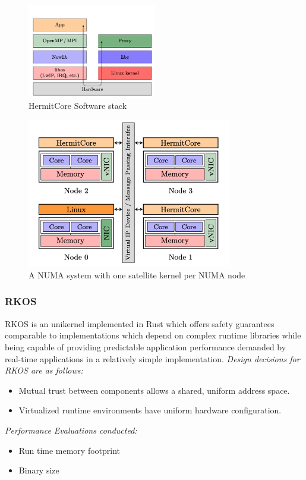 \begin{figure}[htbp!] 
  \centering    
  \includegraphics[width=0.5\textwidth]{HermitCoreStack}
  \caption[HermitCore]{HermitCore Software stack \cite{HermitCore}}
  \label{fig:HermitCoreStack}
  \end{figure}

  \begin{figure}[htbp!] 
    \centering    
    \includegraphics[width=0.8\textwidth]{NumaHermitCore}
    \caption[HermitCore]{A NUMA system with one satellite kernel per NUMA node \cite{HermitCore}}
    \label{fig:HermitCoreStack}
    \end{figure}



\subsubsection{RKOS}
RKOS\cite{RKOS} is an unikernel implemented in Rust which
offers safety guarantees comparable to implementations which depend on complex runtime
libraries while being capable of providing predictable application performance demanded
by real-time applications in a relatively simple implementation. 
\emph{Design decisions for RKOS are as follows:}
\begin{itemize}
  \item Mutual trust between components allows a shared, uniform address space.
  \item Virtualized runtime environments have uniform hardware configuration.
\end{itemize}
\emph{Performance Evaluations conducted:}
\begin{itemize}
  \item Run time memory footprint 
  \item Binary size 
\end{itemize}

